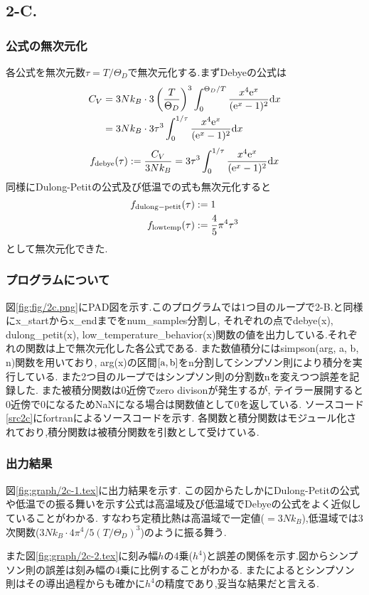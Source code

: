 \subsection*{2-C.}
\subsubsection*{公式の無次元化}
各公式を無次元数$\tau=T/\Theta_D$で無次元化する.まずDebyeの公式は
\begin{align*}
  C_V&=3Nk_B\cdot 3\left(\frac{T}{\Theta_D}\right)^3\int^{\Theta_D/T}_0\frac{x^4{\rm e}^x}{({\rm e}^x-1)^2}{\rm d}x\\
  &=3Nk_B\cdot 3\tau^3\int^{1/\tau}_0\frac{x^4{\rm e}^x}{({\rm e}^x-1)^2}{\rm d}x
\end{align*}
\begin{align*}
  f_{\rm debye}(\tau):=\frac{C_V}{3Nk_B}=3\tau^3\int^{1/\tau}_0\frac{x^4{\rm e}^x}{({\rm e}^x-1)^2}{\rm d}x
\end{align*}
同様にDulong-Petitの公式及び低温での式も無次元化すると
\begin{align*}
  f_{\rm dulong-petit}(\tau)&:=1\\
  f_{\rm lowtemp}(\tau)&:=\frac{4}{5}\pi^4\tau^3
\end{align*}
として無次元化できた.
\subsubsection*{プログラムについて}
図\ref{fig:fig/2c.png}にPAD図を示す.このプログラムでは1つ目のループで2-B.と同様にx\_startからx\_endまでをnum\_samples分割し,
それぞれの点でdebye(x), dulong\_petit(x), low\_temperature\_behavior(x)関数の値を出力している.それぞれの関数は上で無次元化した各公式である.
また数値積分にはsimpson(arg, a, b, n)関数を用いており, arg(x)の区間$\rm [a,b]$をn分割してシンプソン則により積分を実行している.
また2つ目のループではシンプソン則の分割数nを変えつつ誤差を記録した.
また被積分関数は0近傍でzero divisonが発生するが,
テイラー展開すると0近傍で0になるためNaNになる場合は関数値として0を返している.
ソースコード\ref{src2c}にfortranによるソースコードを示す.
各関数と積分関数はモジュール化されており,積分関数は被積分関数を引数として受けている.
\subsubsection*{出力結果}
図\ref{fig:graph/2c-1.tex}に出力結果を示す.
この図からたしかにDulong-Petitの公式や低温での振る舞いを示す公式は高温域及び低温域でDebyeの公式をよく近似していることがわかる.
すなわち定積比熱は高温域で一定値($=3Nk_B$),低温域では3次関数($3Nk_B\cdot4\pi^4/5(T/\Theta_D)^3$)のように振る舞う.

また図\ref{fig:graph/2c-2.tex}に刻み幅$h$の4乗($h^4$)と誤差の関係を示す.図からシンプソン則の誤差は刻み幅の4乗に比例することがわかる.
また\cite{simpson}によるとシンプソン則はその導出過程からも確かに$h^4$の精度であり,妥当な結果だと言える.
